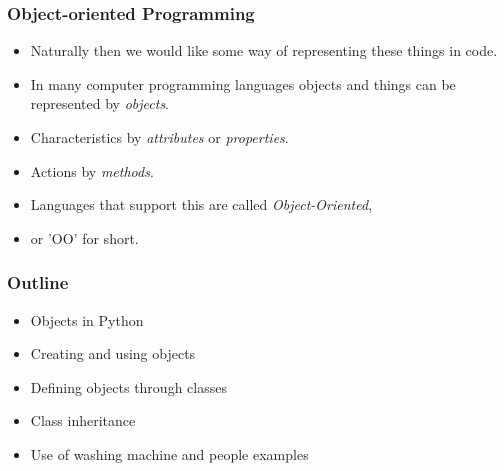 \documentclass{beamer}
\begin{document}
\begin{frame}[fragile]
\frametitle{Object-oriented Programming}

\begin{itemize}
\item Naturally then we would like some way of representing these things in code.
\pause
\item In many computer programming languages objects and things can be represented by \emph{objects}.
\pause
\item Characteristics by \emph{attributes} or \emph{properties}.
\item Actions by \emph{methods}.
\pause
\item Languages that support this are called \emph{Object-Oriented},
\item or 'OO' for short.
\end{itemize}

\end{frame}

\begin{frame}[fragile]
\frametitle{Outline}

\begin{itemize}
\item Objects in Python
\item Creating and using objects
\item Defining objects through classes
\item Class inheritance
\item Use of washing machine and people examples
\end{itemize}

\end{frame}
\end{document}
